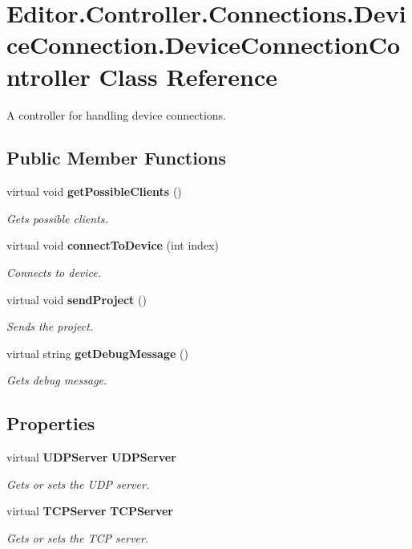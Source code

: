 \section{Editor.\-Controller.\-Connections.\-Device\-Connection.\-Device\-Connection\-Controller Class Reference}
\label{class_editor_1_1_controller_1_1_connections_1_1_device_connection_1_1_device_connection_controller}


A controller for handling device connections.  


\subsection*{Public Member Functions}
\begin{DoxyCompactItemize}
\item 
virtual void {\bf get\-Possible\-Clients} ()
\begin{DoxyCompactList}\small\item\em Gets possible clients. \end{DoxyCompactList}\item 
virtual void {\bf connect\-To\-Device} (int index)
\begin{DoxyCompactList}\small\item\em Connects to device. \end{DoxyCompactList}\item 
virtual void {\bf send\-Project} ()
\begin{DoxyCompactList}\small\item\em Sends the project. \end{DoxyCompactList}\item 
virtual string {\bf get\-Debug\-Message} ()
\begin{DoxyCompactList}\small\item\em Gets debug message. \end{DoxyCompactList}\end{DoxyCompactItemize}
\subsection*{Properties}
\begin{DoxyCompactItemize}
\item 
virtual {\bf U\-D\-P\-Server} {\bf U\-D\-P\-Server}\hspace{0.3cm}{\ttfamily  [get, set]}
\begin{DoxyCompactList}\small\item\em Gets or sets the U\-D\-P server. \end{DoxyCompactList}\item 
virtual {\bf T\-C\-P\-Server} {\bf T\-C\-P\-Server}\hspace{0.3cm}{\ttfamily  [get, set]}
\begin{DoxyCompactList}\small\item\em Gets or sets the T\-C\-P server. \end{DoxyCompactList}\end{DoxyCompactItemize}


